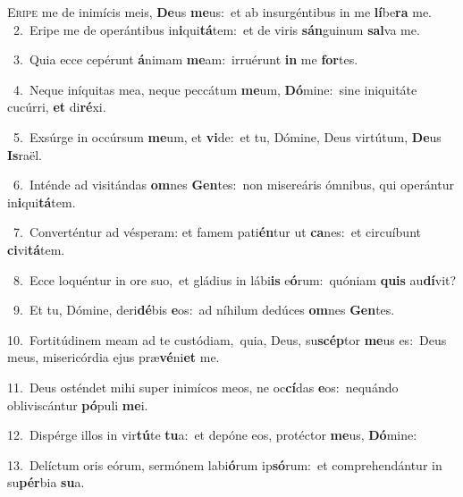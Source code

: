 \lettrine{\initial\textcolor{\initialcolor}{E}}{ripe} me de inimícis meis, \textbf{De}\-us \textbf{me}\-us:~\star et ab insurgéntibus in me \textbf{lí}\-be\textbf{ra} me.\\
{\numbfont\textcolor{\numbcolor}{~2.}}~Eripe me de operántibus in\-\textbf{i}\-qui\-\textbf{tá}\-tem:~\star et de viris \textbf{sán}\-guinum \textbf{sal}\-va me.\par
{\numbfont\textcolor{\numbcolor}{~3.}}~Quia ecce cepérunt \textbf{á}\-nimam \textbf{me}\-am:~\star irruérunt \textbf{in} me \textbf{for}\-tes.\par
{\numbfont\textcolor{\numbcolor}{~4.}}~Neque iníquitas mea, neque peccátum \textbf{me}\-um, \textbf{Dó}\-mine:~\star sine iniquitáte cucúrri, \textbf{et} di\-\textbf{ré}\-xi.\par
{\numbfont\textcolor{\numbcolor}{~5.}}~Exsúrge in occúrsum \textbf{me}\-um, et \textbf{vi}\-de:~\star et tu, Dómine, Deus virtútum, \textbf{De}\-us \textbf{Is}\-raël.\par
{\numbfont\textcolor{\numbcolor}{~6.}}~Inténde ad visitándas \textbf{om}\-nes \textbf{Gen}\-tes:~\star non misereáris ómnibus, qui operántur in\-\textbf{i}\-qui\-\textbf{tá}\-tem.\par
{\numbfont\textcolor{\numbcolor}{~7.}}~Converténtur ad vésperam: et famem pati\-\textbf{én}\-tur ut \textbf{ca}\-nes:~\star et circuíbunt \textbf{ci}\-vi\-\textbf{tá}\-tem.\par
{\numbfont\textcolor{\numbcolor}{~8.}}~Ecce loquéntur in ore suo,~\dagger et gládius in lábi\textbf{is} e\-\textbf{ó}\-rum:~\star quóniam \textbf{quis} au\-\textbf{dí}\-vit?\par
{\numbfont\textcolor{\numbcolor}{~9.}}~Et tu, Dómine, deri\-\textbf{dé}\-bis \textbf{e}\-os:~\star ad níhilum dedúces \textbf{om}\-nes \textbf{Gen}\-tes.\par
{\numbfont\textcolor{\numbcolor}{10.}}~Fortitúdinem meam ad te custódiam,~\dagger quia, Deus, su\-\textbf{scép}\-tor \textbf{me}\-us es:~\star Deus meus, misericórdia ejus præ\-\textbf{vé}\-ni\textbf{et} me.\par
{\numbfont\textcolor{\numbcolor}{11.}}~Deus osténdet mihi super inimícos meos, ne oc\-\textbf{cí}\-das \textbf{e}\-os:~\star nequándo obliviscántur \textbf{pó}\-puli \textbf{me}\-i.\par
{\numbfont\textcolor{\numbcolor}{12.}}~Dispérge illos in vir\-\textbf{tú}\-te \textbf{tu}\-a:~\star et depóne eos, protéctor \textbf{me}\-us, \textbf{Dó}\-mine:\par
{\numbfont\textcolor{\numbcolor}{13.}}~Delíctum oris eórum, sermónem labi\-\textbf{ó}\-rum ip\-\textbf{só}\-rum:~\star et comprehendántur in su\-\textbf{pér}\-bia \textbf{su}\-a.\par
